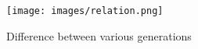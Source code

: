 \documentclass[sigconf]{acmart}
\begin{document}
\begin{figure}[!ht]
  \centering\texttt{[image: images/relation.png]}
  \caption{Difference between various generations \cite{part-reg}}
  \label{Figure 1}
\end{figure}

\end{document}
